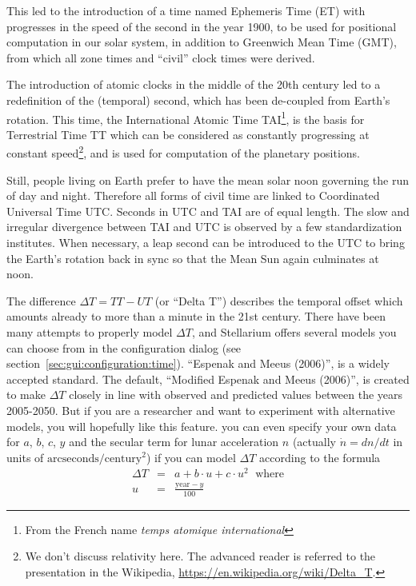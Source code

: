 This led to the introduction of a time named Ephemeris Time (ET) with
progresses in the speed of the second in the year 1900, to be used for
positional computation in our solar system, in addition to Greenwich
Mean Time (GMT), from which all zone times and ``civil'' clock times were
derived.

The introduction of atomic clocks in the middle of the 20th century
led to a redefinition of the (temporal) second, which has been
de-coupled from Earth's rotation. This time, the International Atomic
Time TAI\footnote{From the French name \textit{temps atomique international}}, is the basis for Terrestrial Time TT which can be
considered as constantly progressing at constant speed\footnote{We
  don't discuss relativity here. The advanced reader is referred to
  the presentation in the Wikipedia,
  \url{https://en.wikipedia.org/wiki/Delta_T}.}, and is used for
computation of the planetary positions.

Still, people living on Earth prefer to have the mean solar noon
governing the run of day and night. Therefore all forms of civil time
are linked to Coordinated Universal Time UTC. Seconds in UTC and TAI
are of equal length. The slow and irregular divergence between TAI and
UTC is observed by a few standardization institutes.  When necessary,
a leap second can be introduced to the UTC to bring the Earth's
rotation back in sync so that the Mean Sun again culminates at noon.

The difference $\Delta T=TT-UT$ (or ``Delta T'') describes the
temporal offset which amounts already to more than a minute in the 21st
century. There have been many attempts to properly model $\Delta T$,
and Stellarium offers several models you can choose from in the
configuration dialog (see
section~\ref{sec:gui:configuration:time}). ``Espenak and
Meeus (2006)'', is a widely accepted standard. The default, ``Modified Espenak and
Meeus (2006)'', is created to make $\Delta T$ closely in line with observed and predicted
values between the years 2005-2050. But if you are a researcher and want to experiment
with alternative models, you will hopefully like this feature. you can even specify your own data for
$a$, $b$, $c$, $y$ and the secular term for lunar acceleration $n$
(actually $\dot{n}=dn/dt$ in units of
$\mathrm{arcseconds}/\mathrm{century}^2$) if you can model $\Delta T$
according to the formula
\begin{eqnarray}
  \label{eq:DeltaT:custom}
  \Delta T &=& a+ b\cdot u + c \cdot u^2 \, \ \ \text{where}\\
         u &=& \frac{\mathrm{year}-y}{100}
\end{eqnarray}

